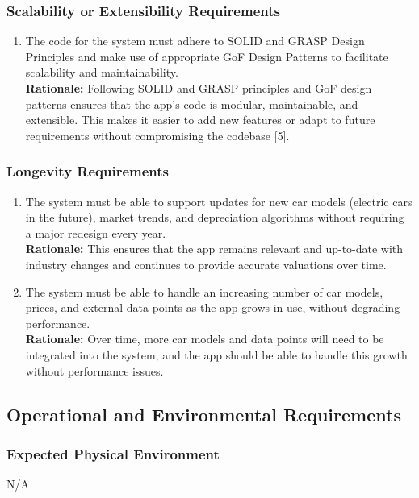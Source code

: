 \documentclass[]{article}
\begin{document}
\subsubsection{Scalability or Extensibility Requirements}
\label{ssub:scalability_or_extensibility_requirements}
\begin{enumerate}[{PR-SE}1.]
    \item The code for the system must adhere to SOLID and GRASP Design Principles and make use of appropriate GoF Design Patterns to facilitate scalability and maintainability.  \\
    \textbf{Rationale:} Following SOLID and GRASP principles and GoF design patterns ensures that the app's code is modular, maintainable, and extensible. This makes it easier to add new features or adapt to future requirements without compromising the codebase [5].
\end{enumerate}

\subsubsection{Longevity Requirements}
\label{ssub:longevity_requirements}
\begin{enumerate}[{PR-L}1.]
    \item The system must be able to support updates for new car models (electric cars in the future), market trends, and depreciation algorithms without requiring a major redesign every year.  \\
    \textbf{Rationale:} This ensures that the app remains relevant and up-to-date with industry changes and continues to provide accurate valuations over time.

    \item The system must be able to handle an increasing number of car models, prices, and external data points as the app grows in use, without degrading performance.  \\
    \textbf{Rationale:} Over time, more car models and data points will need to be integrated into the system, and the app should be able to handle this growth without performance issues.
\end{enumerate}

\subsection{Operational and Environmental Requirements}
\label{sub:operational_environmental_requirements}

\subsubsection{Expected Physical Environment}
\label{ssub:expected_physical_environment}
N/A
\end{document}
